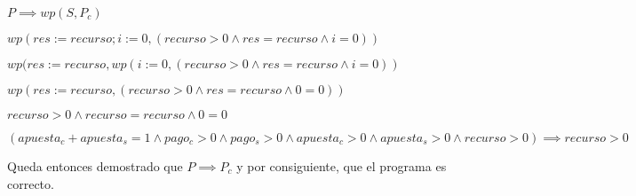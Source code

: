 \documentclass[10pt,a4paper]{article}
\begin{document}
\vspace{0.3cm}

$P \implies wp(S,P_c)$\\

\vspace{0.3cm}

$wp(res := recurso; i:=0, (recurso > 0 \land res = recurso \land i = 0))$

\vspace{0.3cm}
$wp(res := recurso, wp(i:=0, (recurso > 0 \land res = recurso \land i = 0))$

\vspace{0.3cm}
$wp(res := recurso, (recurso > 0 \land res = recurso \land 0 = 0))$

\vspace{0.3cm}
$recurso > 0 \land recurso = recurso \land 0 = 0$

\vspace{0.3cm}
$(apuesta_c + apuesta_s = 1 \land pago_c > 0 \land pago_s > 0 \land apuesta_c > 0 \land apuesta_s > 0 \land recurso > 0) \implies recurso > 0$

\vspace{0.3cm}
Queda entonces demostrado que $P \implies P_c$ y por consiguiente, que el programa es correcto.
\end{document}
